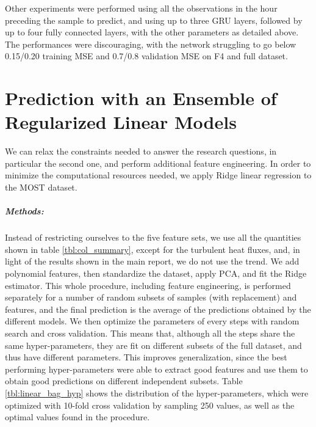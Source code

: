 \documentclass[a4paper]{book}
\begin{document}
Other experiments were performed using all the observations in the hour preceding the sample to predict, and using up to three GRU layers, followed by up to four fully connected layers, with the other parameters as detailed above. The performances were discouraging, with the network struggling to go below 0.15/0.20 training MSE and 0.7/0.8 validation MSE on F4 and full dataset.

\chapter{Prediction with an Ensemble of Regularized Linear Models}
We can relax the constraints needed to answer the research questions, in particular the second one, and perform additional feature engineering. In order to minimize the computational resources needed, we apply Ridge linear regression to the MOST dataset.

\paragraph{Methods:}
Instead of restricting ourselves to the five feature sets, we use all the quantities shown in table \ref{tbl:col_summary}, except for the turbulent heat fluxes, and, in light of the results shown in the main report, we do not use the trend. We add polynomial features, then standardize the dataset, apply PCA, and fit the Ridge estimator. This whole procedure, including feature engineering, is performed separately for a number of random subsets of samples (with replacement) and features, and the final prediction is the average of the predictions obtained by the different models. We then optimize the parameters of every steps with random search and cross validation. This means that, although all the steps share the same hyper-parameters, they are fit on different subsets of the full dataset, and thus have different parameters. This improves generalization, since the best performing hyper-parameters were able to extract good features and use them to obtain good predictions on different independent subsets. Table \ref{tbl:linear_bag_hyp} shows the distribution of the hyper-parameters, which were optimized with 10-fold cross validation by sampling 250 values, as well as the optimal values found in the procedure.
\end{document}
